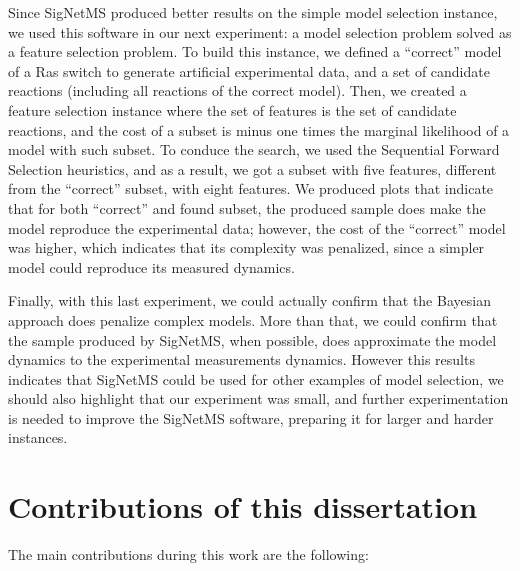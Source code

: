 Since SigNetMS produced better results on the simple model selection
instance, we used this software in our next experiment: a model
selection problem solved as a feature selection problem. To build this
instance, we defined a ``correct'' model of a Ras switch to generate
artificial experimental data, and a set of candidate reactions
(including all reactions of the correct model). Then, we created a
feature selection instance where the set of features is the set of
candidate reactions, and the cost of a subset is minus one times the
marginal likelihood of a model with such subset. To conduce the search,
we used the Sequential Forward Selection heuristics, and as a result, we
got a subset with five features, different from the ``correct'' subset,
with eight features. We produced plots that indicate that for both
``correct'' and found subset, the produced sample does make the model
reproduce the experimental data; however, the cost of the ``correct''
model was higher, which indicates that its complexity was penalized,
since a simpler model could reproduce its measured dynamics.

Finally, with this last experiment, we could actually confirm that the
Bayesian approach does penalize complex models. More than that, we could
confirm that the sample produced by SigNetMS, when possible, does
approximate the model dynamics to the experimental measurements
dynamics. However this results indicates that SigNetMS could be used for
other examples of model selection, we should also highlight that our
experiment was small, and further experimentation is needed to improve
the SigNetMS software, preparing it for larger and harder instances.

\section{Contributions of this dissertation}
The main contributions during this work are the following:


